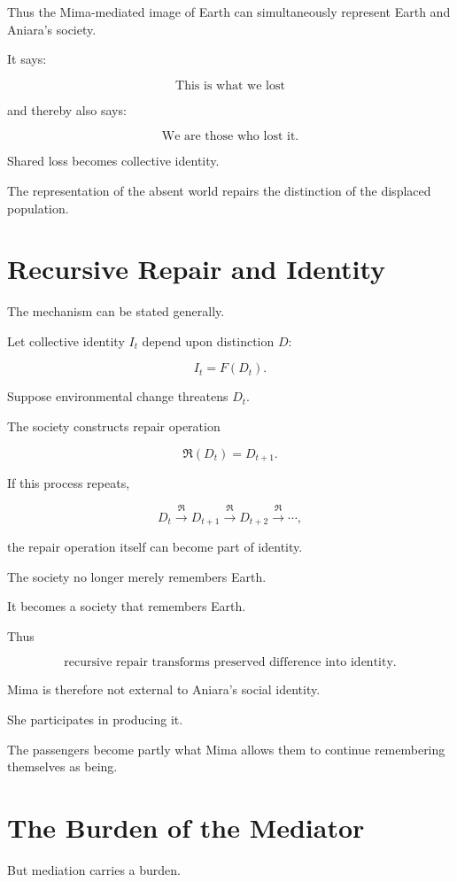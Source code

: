 \documentclass[11pt,oneside]{book}
\theoremstyle{definition}
\theoremstyle{remark}
\newcommand{\Repair}{\mathfrak{R}}
\begin{document}
Thus the Mima-mediated image of Earth can simultaneously represent Earth and Aniara's society.

It says:

\[
\text{This is what we lost}
\]

and thereby also says:

\[
\text{We are those who lost it}.
\]

Shared loss becomes collective identity.

The representation of the absent world repairs the distinction of the displaced population.

\section{Recursive Repair and Identity}

The mechanism can be stated generally.

Let collective identity \(I_t\) depend upon distinction \(D\):

\[
I_t=F(D_t).
\]

Suppose environmental change threatens \(D_t\).

The society constructs repair operation

\[
\Repair(D_t)
=
D_{t+1}.
\]

If this process repeats,

\[
D_t
\xrightarrow{\Repair}
D_{t+1}
\xrightarrow{\Repair}
D_{t+2}
\xrightarrow{\Repair}
\cdots,
\]

the repair operation itself can become part of identity.

The society no longer merely remembers Earth.

It becomes a society that remembers Earth.

Thus

\[
\boxed{
\text{recursive repair transforms preserved difference into identity}.
}
\]

Mima is therefore not external to Aniara's social identity.

She participates in producing it.

The passengers become partly what Mima allows them to continue remembering themselves as being.

\section{The Burden of the Mediator}

But mediation carries a burden.
\end{document}
